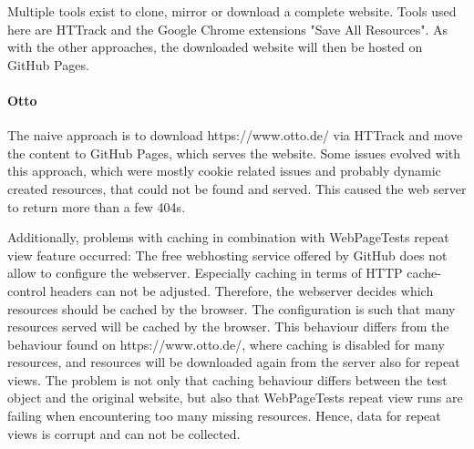 
Multiple tools exist to clone, mirror or download a complete website.
Tools used here are HTTrack and the Google Chrome extensions "Save All Resources".
As with the other approaches, the downloaded website will then be hosted on GitHub Pages.



\paragraph{Otto}


The naive approach is to download https://www.otto.de/ via HTTrack and move the content to GitHub Pages, which serves the website.
Some issues evolved with this approach, which were mostly cookie related issues and probably dynamic created resources, that could not be found and served.
This caused the web server to return more than a few 404s.

Additionally, problems with caching in combination with WebPageTests repeat view feature occurred:
The free webhosting service offered by GitHub does not allow to configure the webserver.
Especially caching in terms of HTTP cache-control headers can not be adjusted.
Therefore, the webserver decides which resources should be cached by the browser.
The configuration is such that many resources served will be cached by the browser.
This behaviour differs from the behaviour found on https://www.otto.de/, where caching is disabled for many resources, and resources will be downloaded again from the server also for repeat views.
The problem is not only that caching behaviour differs between the test object and the original website, but also that WebPageTests repeat view runs are failing when encountering too many missing resources.
Hence, data for repeat views is corrupt and can not be collected.




